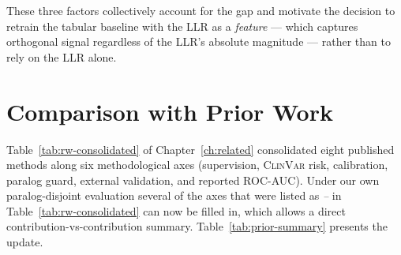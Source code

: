 \documentclass[11pt,a4paper,oneside]{report}
\begin{document}
These three factors collectively account for the gap and
motivate the decision to retrain the tabular
baseline with the LLR as a \emph{feature} --- which
captures orthogonal signal regardless of the LLR's
absolute magnitude --- rather than to rely on the LLR alone.

\section{Comparison with Prior Work}
\label{sec:res-prior}

Table~\ref{tab:rw-consolidated} of Chapter~\ref{ch:related}
consolidated eight published methods along six
methodological axes (supervision, \textsc{ClinVar} risk,
calibration, paralog guard, external validation, and
reported ROC-AUC). Under our own paralog-disjoint
evaluation several of the axes that were listed as
\emph{--} in Table~\ref{tab:rw-consolidated} can now be
filled in, which allows a direct
contribution-vs-contribution summary.
Table~\ref{tab:prior-summary} presents the update.
\end{document}
